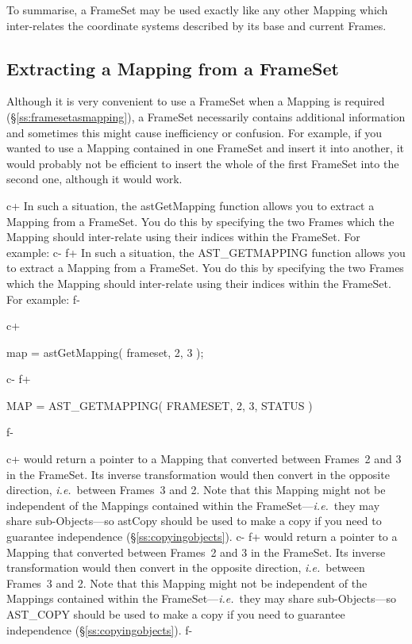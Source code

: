 \documentclass[twoside,11pt]{starlink}
\providecommand{\secref}[1]{\S\ref{#1}}
\begin{document}
{To summarise, a FrameSet may be used exactly like any other Mapping
which inter-relates the coordinate systems described by its base and
current Frames.

\subsection{\label{ss:extractingamapping}Extracting a Mapping from a FrameSet}

Although it is very convenient to use a FrameSet when a Mapping is
required (\secref{ss:framesetasmapping}), a FrameSet necessarily
contains additional information and sometimes this might cause
inefficiency or confusion.  For example, if you wanted to use a
Mapping contained in one FrameSet and insert it into another, it would
probably not be efficient to insert the whole of the first FrameSet
into the second one, although it would work.

c+
In such a situation, the astGetMapping function allows you to extract
a Mapping from a FrameSet. You do this by specifying the two Frames
which the Mapping should inter-relate using their indices within the
FrameSet. For example:
c-
f+
In such a situation, the AST\_GETMAPPING function allows you to
extract a Mapping from a FrameSet. You do this by specifying the two
Frames which the Mapping should inter-relate using their indices
within the FrameSet. For example:
f-

c+
\small
\begin{terminalv}
map = astGetMapping( frameset, 2, 3 );
\end{terminalv}
\normalsize
c-
f+
\small
\begin{terminalv}
      MAP = AST_GETMAPPING( FRAMESET, 2, 3, STATUS )
\end{terminalv}
\normalsize
f-

c+
would return a pointer to a Mapping that converted between Frames~2
and 3 in the FrameSet. Its inverse transformation would then convert
in the opposite direction, \emph{i.e.}\ between Frames~3 and 2.  Note
that this Mapping might not be independent of the Mappings contained
within the FrameSet---\emph{i.e.}\ they may share sub-Objects---so
astCopy should be used to make a copy if you need to guarantee
independence (\secref{ss:copyingobjects}).
c-
f+
would return a pointer to a Mapping that converted between Frames~2
and 3 in the FrameSet. Its inverse transformation would then convert
in the opposite direction, \emph{i.e.}\ between Frames~3 and 2.  Note
that this Mapping might not be independent of the Mappings contained
within the FrameSet---\emph{i.e.}\ they may share sub-Objects---so
AST\_COPY should be used to make a copy if you need to guarantee
independence (\secref{ss:copyingobjects}).
f-

}
\end{document}
